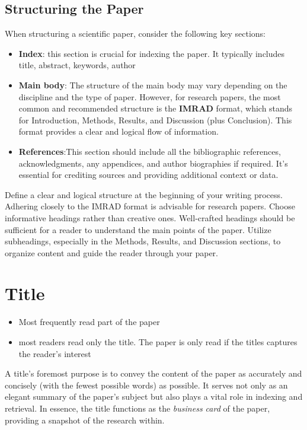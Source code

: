\documentclass[
    twocolumn,
    fontsize = 10pt,
    parskip = half+,
    headings = small,
    headwidth = text,
    footwidth = text,
]{scrartcl}
\begin{document}
\subsection{Structuring the Paper}
When structuring a scientific paper, consider the following key sections: 
\begin{itemize}
    \item \textbf{Index}: this section is crucial for indexing the paper. It typically includes title, abstract, keywords, author
    \item \textbf{Main body}:  The structure of the main body may vary depending on the discipline and the type of paper. However, for research papers, the most common and recommended structure is the \textbf{IMRAD} format, which stands for Introduction, Methods, Results, and Discussion (plus Conclusion). This format provides a clear and logical flow of information.
    \item \textbf{References}:This section should include all the bibliographic references, acknowledgments, any appendices, and author biographies if required. It's essential for crediting sources and providing additional context or data.
\end{itemize} 

Define a clear and logical structure at the beginning of your writing process. Adhering closely to the IMRAD format is advisable for research papers.  Choose informative headings rather than creative ones. Well-crafted headings should be sufficient for a reader to understand the main points of the paper. Utilize subheadings, especially in the Methods, Results, and Discussion sections, to organize content and guide the reader through your paper.

\section{Title}
\begin{itemize}
    \item Most frequently read part of the paper
    \item most readers read only the title. The paper is only read if the titles captures the reader's interest
\end{itemize}
A title’s foremost purpose is to convey the content of the paper as accurately and concisely (with the fewest possible words) as possible.  
It serves not only as an elegant summary of the paper's subject but also plays a vital role in indexing and retrieval.
In essence, the title functions as the \textsl{business card} of the paper, providing a snapshot of the research within. 
\end{document}
